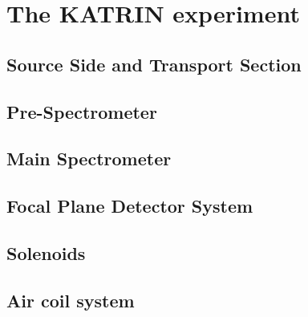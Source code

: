     \chapter{The KATRIN experiment}
    \label{ch:The KATRIN experiment}
      
      \section{Source Side and Transport Section}
      \label{ch:The KATRIN experiment:sec:sourceSide}
      
      \section{Pre-Spectrometer}
      \label{ch:The KATRIN experiment:sec:sourceSide}
      
      \section{Main Spectrometer}
      \label{ch:The KATRIN experiment:sec:macE}
      
      \section{Focal Plane Detector System}
      \label{ch:The KATRIN experiment:sec:mainDetectorSystem}
      
      \section{Solenoids}
      \label{ch:The KATRIN experiment:sec:solenoids}
      
      \section{Air coil system}
      \label{ch:The KATRIN experiment:sec:Air coil system}



